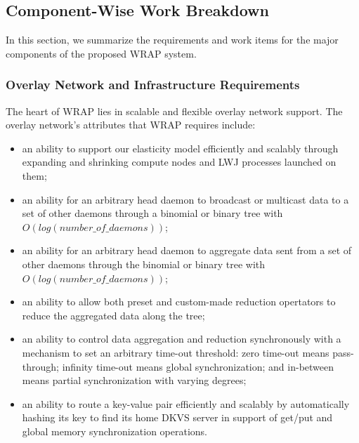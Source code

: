\subsection{Component-Wise Work Breakdown}
In this section, we summarize the requirements and work items for
the major components of the proposed WRAP system.

\subsubsection{Overlay Network and Infrastructure Requirements}
The heart of WRAP lies in scalable and flexible overlay network support.
The overlay network's attributes that WRAP requires include:

\begin{itemize}

\item{an ability to support our elasticity model
efficiently and scalably through expanding and shrinking
compute nodes and LWJ processes launched on them;}

\item{an ability for an arbitrary head daemon to broadcast
or multicast data to a set of other daemons through a binomial
or binary tree with $O(log(number\_of\_daemons))$;}

\item{an ability for an arbitrary head daemon to aggregate data
sent from a set of other daemons through the binomial
or binary tree with $O(log(number\_of\_daemons))$;}

\item{an ability to allow both preset and custom-made reduction
opertators to reduce the aggregated data along the tree;}

\item{an ability to control data aggregation and reduction synchronously
with a mechanism to set an arbitrary time-out threshold: zero time-out means pass-through;
infinity time-out means global synchronization; and
in-between means partial synchronization with varying degrees;}

\item{an ability to route a key-value pair efficiently and
scalably by automatically hashing its key to find its home DKVS server
in support of get/put and global memory synchronization operations.}

\end{itemize}

